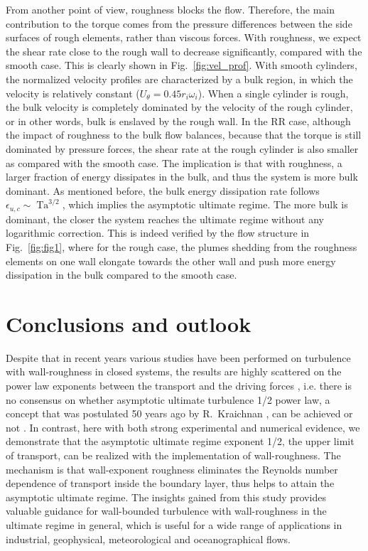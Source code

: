 \documentclass[aps,prl,superscriptaddress,preprint]{revtex4}
\newcommand{\Ta}{\operatorname{Ta}}
\begin{document}
From another point of view, roughness blocks the flow. Therefore, the main contribution to the torque comes from the pressure differences between the side surfaces of rough elements, rather than viscous forces. With roughness, we expect the shear rate close to the rough wall to decrease significantly, compared with the smooth case. This is clearly shown in Fig.\  \ref{fig:vel_prof}. With smooth cylinders, the normalized velocity profiles are characterized by a bulk region, in which the velocity is relatively constant ($U_{\theta}=0.45r_i \omega_i$). When a single cylinder is rough, the bulk velocity is completely dominated by the velocity of the rough cylinder, or in other words, bulk is enslaved by the rough wall. In the RR case, although the impact of roughness to the bulk flow balances, because that the torque is still dominated by pressure forces, the shear rate at the rough cylinder is also smaller as compared with the smooth case. The implication is that with roughness, a larger fraction of energy dissipates in the bulk, and thus the system is more bulk dominant. As mentioned before, the bulk energy dissipation rate follows $\epsilon_{u,c}\sim \Ta^{3/2}$, which implies the asymptotic ultimate regime. The more bulk is dominant, the closer the system reaches the ultimate regime without any logarithmic correction. This is indeed verified by the flow structure in Fig.\  \ref{fig:fig1}, where for the rough case, the plumes shedding from the roughness elements on one wall elongate towards the other wall and push more energy dissipation in the bulk compared to the smooth case.   


\section{Conclusions and outlook} 

Despite that in recent years various studies have been performed on turbulence with wall-roughness in closed systems, the results are highly scattered on the power law exponents between the transport and the driving forces \cite{cil99,she96,du00,roc01,ber03,tis11}, i.e. there is no consensus on whether asymptotic ultimate turbulence 1/2 power law, a concept that was postulated 50 years ago by R.\ Kraichnan \cite{kra62}, can be achieved or not \cite{ahl09}. In contrast, here with both strong experimental and numerical evidence, we demonstrate that the asymptotic ultimate regime exponent 1/2, the upper limit of transport, can be realized with the implementation of wall-roughness. The mechanism is that wall-exponent roughness eliminates the Reynolds number dependence of transport inside the boundary layer, thus helps to attain the asymptotic ultimate regime. The insights gained from this study provides valuable guidance for wall-bounded turbulence with wall-roughness in the ultimate regime in general, which is useful for a wide range of applications in industrial, geophysical, meteorological and oceanographical flows.
\end{document}
